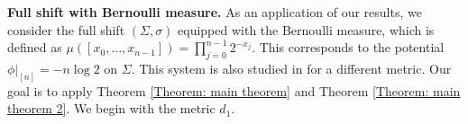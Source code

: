\documentclass[11pt, reqno]{amsart}
\theoremstyle{plain}%
\newtheorem{remark}[theorem]{Remark}
\theoremstyle{definition}
\theoremstyle{definition}
\def\ulx{\underline{x}}
\numberwithin{equation}{section}
\begin{document}





\textbf{Full shift with Bernoulli measure.} As an application of our results, we consider the full shift $(\Sigma,\sigma)$ equipped with the Bernoulli measure, which is defined as $\mu([x_0,\ldots,x_{n-1}])=\prod_{j=0}^{n-1} 2^{-x_j}$. This corresponds to the potential $\phi\big|_{[n]}=-n\log 2$ on $\Sigma$.  This system is also studied in \cite[Proposition 3.1]{Zhao} for a different metric. Our goal is to apply Theorem \ref{Theorem: main theorem} and Theorem \ref{Theorem: main theorem 2}. We begin with the metric $d_1$.
\end{document}
